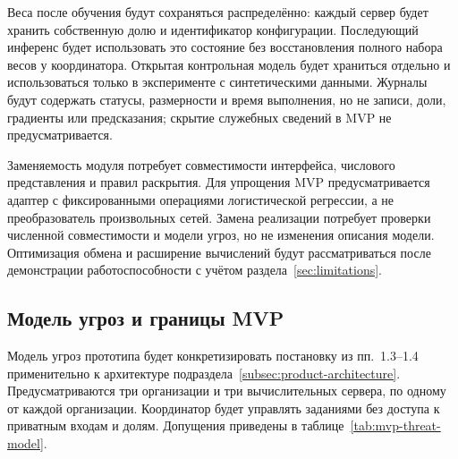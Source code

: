 Веса после обучения будут сохраняться распределённо: каждый сервер будет хранить собственную долю и идентификатор конфигурации. Последующий инференс будет использовать это состояние без восстановления полного набора весов у координатора. Открытая контрольная модель будет храниться отдельно и использоваться только в эксперименте с синтетическими данными. Журналы будут содержать статусы, размерности и время выполнения, но не записи, доли, градиенты или предсказания; скрытие служебных сведений в MVP не предусматривается.

Заменяемость модуля потребует совместимости интерфейса, числового представления и правил раскрытия. Для упрощения MVP предусматривается адаптер с фиксированными операциями логистической регрессии, а не преобразователь произвольных сетей. Замена реализации потребует проверки численной совместимости и модели угроз, но не изменения описания модели. Оптимизация обмена и расширение вычислений будут рассматриваться после демонстрации работоспособности с учётом раздела~\ref{sec:limitations}.

\subsection{Модель угроз и границы MVP}
\label{subsec:mvp-threat-model}

Модель угроз прототипа будет конкретизировать постановку из пп.~1.3--1.4 применительно к архитектуре подраздела~\ref{subsec:product-architecture}. Предусматриваются три организации и три вычислительных сервера, по одному от каждой организации. Координатор будет управлять заданиями без доступа к приватным входам и долям. Допущения приведены в таблице~\ref{tab:mvp-threat-model}.

